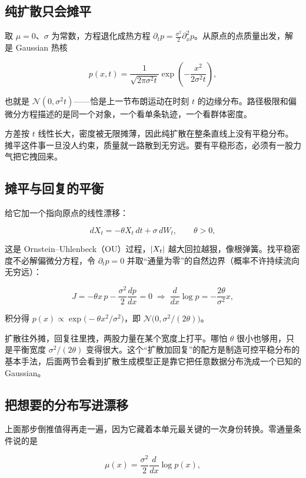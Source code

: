 \subsection{纯扩散只会摊平}

取 \(\mu=0\)、\(\sigma\) 为常数，方程退化成热方程 \(\partial_tp=\tfrac{\sigma^2}{2}\partial_x^2p\)。从原点的点质量出发，解是 Gaussian 热核

\[
p(x,t)=\frac{1}{\sqrt{2\pi\sigma^2t}}\exp\!\left(-\frac{x^2}{2\sigma^2t}\right),
\]

也就是 \(\mathcal N(0,\sigma^2t)\)——恰是上一节布朗运动在时刻 \(t\) 的边缘分布。路径极限和偏微分方程描述的是同一个对象，一个看单条轨迹，一个看群体密度。

方差按 \(t\) 线性长大，密度被无限摊薄，因此纯扩散在整条直线上没有平稳分布。摊平这件事一旦没人约束，质量就一路散到无穷远。要有平稳形态，必须有一股力气把它拽回来。

\subsection{摊平与回复的平衡}

给它加一个指向原点的线性漂移：

\[
dX_t=-\theta X_t\,dt+\sigma\,dW_t,\qquad\theta>0,
\]

这是 Ornstein--Uhlenbeck（OU）过程，\(\left|X_t\right|\) 越大回拉越狠，像根弹簧。找平稳密度不必解偏微分方程，令 \(\partial_tp=0\) 并取``通量为零''的自然边界（概率不许持续流向无穷远）：

\[
J=-\theta x\,p-\frac{\sigma^2}{2}\frac{dp}{dx}=0
\;\Longrightarrow\;
\frac{d}{dx}\log p=-\frac{2\theta}{\sigma^2}x,
\]

积分得 \(p(x)\propto\exp\big(-\theta x^2/\sigma^2\big)\)，即 \(\mathcal N\big(0,\sigma^2/(2\theta)\big)\)。

扩散往外摊，回复往里拽，两股力量在某个宽度上打平。哪怕 \(\theta\) 很小也够用，只是平衡宽度 \(\sigma^2/(2\theta)\) 变得很大。这个``扩散加回复''的配方是制造可控平稳分布的基本手法，后面两节会看到扩散生成模型正是靠它把任意数据分布洗成一个已知的 Gaussian。

\subsection{把想要的分布写进漂移}

上面那步倒推值得再走一遍，因为它藏着本单元最关键的一次身份转换。零通量条件说的是

\[
\mu(x)=\frac{\sigma^2}{2}\frac{d}{dx}\log p(x),
\]

